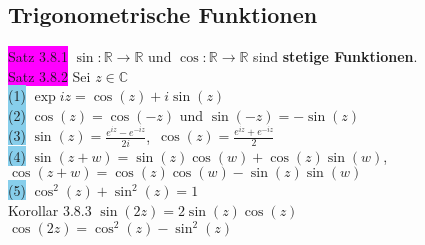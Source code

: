 \documentclass[landscape, 10pt]{article}
\newcommand{\R}{\mathbb{R}}
\newcommand{\C}{\mathbb{C}}
\begin{document}
\begin{multicols}{3}
       \subsection{Trigonometrische Funktionen}
              \colorbox{magenta}{Satz 3.8.1} 
                     \textcolor{NavyBlue}{$\sin:\R\longrightarrow\R$} 
                     und 
                     \textcolor{NavyBlue}{$\cos:\R\longrightarrow\R$} 
                     sind \textbf{stetige Funktionen}.\\
              \colorbox{magenta}{Satz 3.8.2} 
                     Sei \textcolor{NavyBlue}{$z\in\C$}\\
                     \colorbox{SkyBlue}{(1)} 
                            \textcolor{NavyBlue}{$\exp iz=\cos(z)+i\sin(z)$} \\
                     \colorbox{SkyBlue}{(2)} 
                            \textcolor{NavyBlue}{$\cos(z)=\cos(-z)$} und 
                            \textcolor{NavyBlue}{$\sin(-z)=-\sin(z)$}\\
                     \colorbox{SkyBlue}{(3)} 
                            \textcolor{NavyBlue}{
                            $\sin(z)=\frac{e^{iz}-e^{-iz}}{2i}$},\,
                            \textcolor{NavyBlue}{
                            $\cos(z)=\frac{e^{iz}+e^{-iz}}{2}$}\\
                     \colorbox{SkyBlue}{(4)} 
                            \textcolor{NavyBlue}{
                            $\sin(z+w)=\sin(z)\cos(w)+\cos(z)\sin(w)$},\,
                            \textcolor{NavyBlue}{
                            $\cos(z+w)=\cos(z)\cos(w)-\sin(z)\sin(w)$}\\ 
                     \colorbox{SkyBlue}{(5)} 
                            \textcolor{NavyBlue}{$\cos^2(z)+\sin^2(z)=1$}\\
              \colorbox{BurntOrange}{Korollar 3.8.3} 
                     \textcolor{NavyBlue}{$\sin(2z)=2\sin(z)\cos(z)$}\\
                     \textcolor{NavyBlue}{$\cos(2z)=\cos^2(z)-\sin^2(z)$}

\end{multicols}
\end{document}
